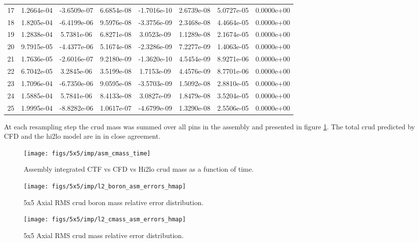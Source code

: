 \begin{table}[h]
\begin{center}
\begin{tabular}[h]{|c|c|c|c|c|c|c|c|}
17  & 1.2664e-04 & -3.6509e-07 & 6.6854e-08 & -1.7016e-10 & 2.6739e-08 & 5.0727e-05 & 0.0000e+00 \\
18  & 1.8205e-04 & -6.4199e-06 & 9.5976e-08 & -3.3756e-09 & 2.3468e-08 & 4.4664e-05 & 0.0000e+00 \\
19  & 1.2838e-04 & 5.7381e-06 & 6.8271e-08 & 3.0523e-09 & 1.1289e-08 & 2.1674e-05 & 0.0000e+00 \\
20  & 9.7915e-05 & -4.4377e-06 & 5.1674e-08 & -2.3286e-09 & 7.2277e-09 & 1.4063e-05 & 0.0000e+00 \\
21  & 1.7636e-05 & -2.6016e-07 & 9.2180e-09 & -1.3620e-10 & 4.5454e-09 & 8.9271e-06 & 0.0000e+00 \\
22  & 6.7042e-05 & 3.2845e-06 & 3.5199e-08 & 1.7153e-09 & 4.4576e-09 & 8.7701e-06 & 0.0000e+00 \\
23  & 1.7096e-04 & -6.7350e-06 & 9.0595e-08 & -3.5703e-09 & 1.5092e-08 & 2.8810e-05 & 0.0000e+00 \\
24  & 1.5885e-04 & 5.7841e-06 & 8.4133e-08 & 3.0827e-09 & 1.8479e-08 & 3.5204e-05 & 0.0000e+00 \\
25  & 1.9995e-04 & -8.8282e-06 & 1.0617e-07 & -4.6799e-09 & 1.3290e-08 & 2.5506e-05 & 0.0000e+00 \\
\hline
\end{tabular}
\label{tab:loo_rms}
\end{center}
\end{table}

At each resampling step the crud mass was summed over all pins in the assembly and presented in figure \ref{fig:asmcmasstime}.  The total crud predicted by CFD and the hi2lo model are in in close agreement.

\begin{figure}[H]
    \centering
    \texttt{[image: figs/5x5/imp/asm\_cmass\_time]}
    \caption{Assembly integrated CTF vs CFD vs Hi2lo crud mass as a function of time.}
    \label{fig:asmcmasstime}
\end{figure}

\begin{figure}[H]
    \centering
    \texttt{[image: figs/5x5/imp/l2\_boron\_asm\_errors\_hmap]}
    \caption{5x5 Axial RMS crud boron mass relative error distribution.}
    \label{fig:l2boronasmerrorshmap}
\end{figure}
\begin{figure}[H]
    \centering
    \texttt{[image: figs/5x5/imp/l2\_cmass\_asm\_errors\_hmap]}
    \caption{5x5 Axial RMS crud mass relative error distribution.}
    \label{fig:l2cmassasmerrorshmap}
\end{figure}


